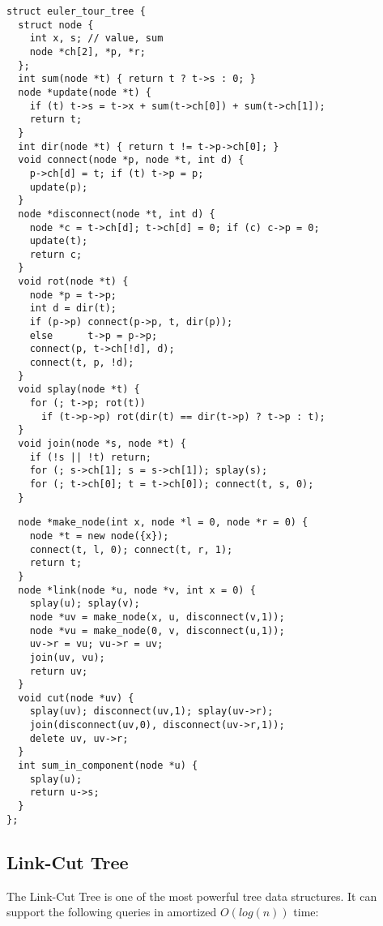 \begin{center}
\begin{minipage}[t]{0.45\linewidth}
\begin{lstlisting}
struct euler_tour_tree {
  struct node {
    int x, s; // value, sum
    node *ch[2], *p, *r;
  };
  int sum(node *t) { return t ? t->s : 0; }
  node *update(node *t) {
    if (t) t->s = t->x + sum(t->ch[0]) + sum(t->ch[1]);
    return t;
  }
  int dir(node *t) { return t != t->p->ch[0]; }
  void connect(node *p, node *t, int d) {
    p->ch[d] = t; if (t) t->p = p;
    update(p);
  }
  node *disconnect(node *t, int d) {
    node *c = t->ch[d]; t->ch[d] = 0; if (c) c->p = 0; 
    update(t);
    return c;
  }
  void rot(node *t) {
    node *p = t->p;
    int d = dir(t); 
    if (p->p) connect(p->p, t, dir(p));
    else      t->p = p->p;
    connect(p, t->ch[!d], d);
    connect(t, p, !d);
  }
  void splay(node *t) {
    for (; t->p; rot(t))
      if (t->p->p) rot(dir(t) == dir(t->p) ? t->p : t);
  }
  void join(node *s, node *t) {
    if (!s || !t) return;
    for (; s->ch[1]; s = s->ch[1]); splay(s);
    for (; t->ch[0]; t = t->ch[0]); connect(t, s, 0);
  }
\end{lstlisting}
\end{minipage}
\qquad
\begin{minipage}[t]{0.45\linewidth}
\begin{lstlisting}
  node *make_node(int x, node *l = 0, node *r = 0) {
    node *t = new node({x});
    connect(t, l, 0); connect(t, r, 1);
    return t;
  }
  node *link(node *u, node *v, int x = 0) {
    splay(u); splay(v); 
    node *uv = make_node(x, u, disconnect(v,1));
    node *vu = make_node(0, v, disconnect(u,1));
    uv->r = vu; vu->r = uv;
    join(uv, vu);
    return uv;
  }
  void cut(node *uv) {
    splay(uv); disconnect(uv,1); splay(uv->r); 
    join(disconnect(uv,0), disconnect(uv->r,1));
    delete uv, uv->r;
  }
  int sum_in_component(node *u) {
    splay(u);
    return u->s;
  }
};
\end{lstlisting}
\end{minipage}
\end{center}

\newpage

\subsection{Link-Cut Tree}

The Link-Cut Tree is one of the most powerful tree data structures.
It can support the following queries in amortized $O(log(n))$ time:

